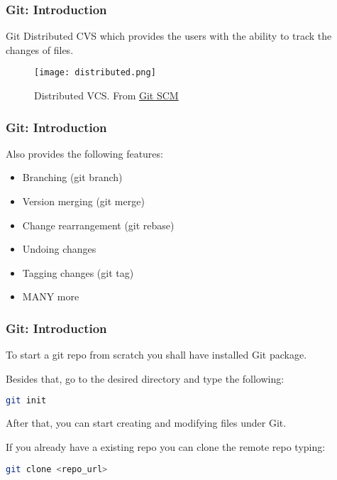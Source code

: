 \begin{frame}

\frametitle{Git: Introduction}

\begin{block}{Git}
Distributed CVS which provides the users with the ability to track the changes of files. 
\end{block}

\begin{figure}
\texttt{[image: distributed.png]}
\caption{Distributed VCS. From \href{https://git-scm.com/book/en/v2/Getting-Started-About-Version-Control}{Git SCM}}
\label{fig:distributed}
\end{figure}

\end{frame}

\begin{frame}

\frametitle{Git: Introduction}

Also provides the following features:
\begin{itemize}
\item Branching (git branch)
\item Version merging (git merge)
\item Change rearrangement (git rebase)
\item Undoing changes
\item Tagging changes (git tag)
\item MANY more
\end{itemize}

\end{frame}

\begin{frame}[fragile]

\frametitle{Git: Introduction}

To start a git repo from scratch you shall have installed Git package. 

Besides that, go to the desired directory and type the following:

\begin{lstlisting}[language=Bash]
git init
\end{lstlisting}

After that, you can start creating and modifying files under Git.

If you already have a existing repo you can clone the remote repo typing:

\begin{lstlisting}[language=Bash]
git clone <repo_url>
\end{lstlisting}

\end{frame}
